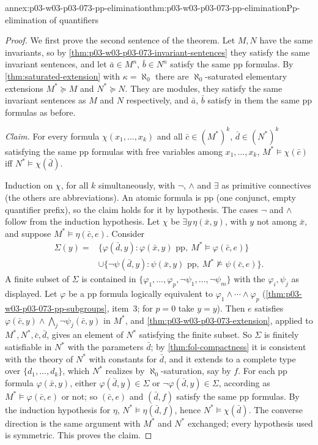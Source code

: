 \begin{annexitem}{annex:p03-w03-p03-073-pp-elimination}{thm:p03-w03-p03-073-pp-elimination}{Pp-elimination of quantifiers}
\begin{proof}
We first prove the second sentence of the theorem. Let \(M,N\) have the
same invariants, so by \cref{thm:p03-w03-p03-073-invariant-sentences}
they satisfy the same invariant sentences, and let \(\bar a\in M^n\),
\(\bar b\in N^n\) satisfy the same pp formulas. By
\cref{thm:saturated-extension} with \(\kappa=\aleph_0\) there are
\(\aleph_0\)-saturated elementary extensions \(M^*\succcurlyeq M\) and
\(N^*\succcurlyeq N\). They are modules, they satisfy the same invariant
sentences as \(M\) and \(N\) respectively, and \(\bar a\), \(\bar b\)
satisfy in them the same pp formulas as before.

\emph{Claim.} For every formula \(\chi(x_1,\ldots,x_k)\) and all
\(\bar c\in(M^*)^k\), \(\bar d\in(N^*)^k\) satisfying the same pp formulas
with free variables among \(x_1,\ldots,x_k\),
\(M^*\models\chi(\bar c)\) iff \(N^*\models\chi(\bar d)\).

Induction on \(\chi\), for all \(k\) simultaneously, with \(\neg\),
\(\wedge\) and \(\exists\) as primitive connectives (the others are
abbreviations). An atomic formula is pp (one conjunct, empty quantifier
prefix), so the claim holds for it by hypothesis. The cases \(\neg\) and
\(\wedge\) follow from the induction hypothesis. Let \(\chi\) be
\(\exists y\,\eta(\bar x,y)\), with \(y\) not among \(\bar x\), and suppose
\(M^*\models\eta(\bar c,e)\). Consider
\begin{align*}
 \Sigma(y)={}&\{\varphi(\bar d,y):\varphi(\bar x,y)\text{ pp},\ M^*\models\varphi(\bar c,e)\}\\
 &\cup\{\neg\psi(\bar d,y):\psi(\bar x,y)\text{ pp},\ M^*\not\models\psi(\bar c,e)\}.
\end{align*}
A finite subset of \(\Sigma\) is contained in
\(\{\varphi_1,\ldots,\varphi_p,\neg\psi_1,\ldots,\neg\psi_m\}\) with the
\(\varphi_i,\psi_j\) as displayed. Let \(\varphi\) be a pp formula
logically equivalent to \(\varphi_1\wedge\cdots\wedge\varphi_p\)
(\cref{thm:p03-w03-p03-073-pp-subgroups}, item~3; for \(p=0\) take
\(y=y\)). Then \(e\) satisfies
\(\varphi(\bar c,y)\wedge\bigwedge_j\neg\psi_j(\bar c,y)\) in \(M^*\), and
\cref{thm:p03-w03-p03-073-extension}, applied to \(M^*,N^*,\bar c,\bar d\),
gives an element of \(N^*\) satisfying the finite subset. So \(\Sigma\) is
finitely satisfiable in \(N^*\) with the parameters \(\bar d\); by
\cref{thm:fol-compactness} it is consistent with the theory of
\(N^*\) with constants for \(\bar d\), and it extends to a complete type
over \(\{d_1,\ldots,d_k\}\), which \(N^*\) realizes by
\(\aleph_0\)-saturation, say by \(f\). For each pp formula
\(\varphi(\bar x,y)\), either \(\varphi(\bar d,y)\in\Sigma\) or
\(\neg\varphi(\bar d,y)\in\Sigma\), according as \(M^*\models\varphi(\bar
c,e)\) or not; so \((\bar c,e)\) and \((\bar d,f)\) satisfy the same pp
formulas. By the induction hypothesis for \(\eta\),
\(N^*\models\eta(\bar d,f)\), hence \(N^*\models\chi(\bar d)\). The converse
direction is the same argument with \(M^*\) and \(N^*\) exchanged; every
hypothesis used is symmetric. This proves the claim.


\end{proof}
\end{annexitem}
